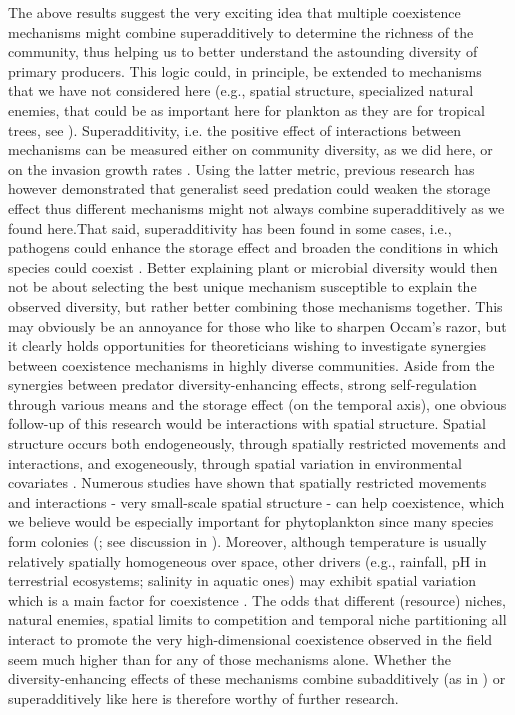 \documentclass[a4paper,12pt]{article}
\begin{document}
The above results suggest the very exciting idea that multiple coexistence
mechanisms might combine superadditively to determine the richness
of the community, thus helping us to better understand the astounding
diversity of primary producers. This logic could, in principle, be
extended to mechanisms that we have not considered here (e.g., spatial
structure, specialized natural enemies, that could be as important
here for plankton as they are for tropical trees, see \citealp{bagchi_pathogens_2014,comita_testing_2014,barraquand2018coastal}).
Superadditivity, i.e. the positive effect of interactions between
mechanisms can be measured either on community diversity, as we did
here, or on the invasion growth rates \citep{ellner_expanded_2019}.
Using the latter metric, previous research has however demonstrated
that generalist seed predation could weaken the storage effect \citep{kuang_coexistence_2009,kuang_interacting_2010}
thus different mechanisms might not always combine superadditively
as we found here.That said, superadditivity has been found in some
cases, i.e., pathogens could enhance the storage effect and broaden
the conditions in which species could coexist \citep{mordecai_pathogen_2015}.
Better explaining plant or microbial diversity would then not be about
selecting the best unique mechanism susceptible to explain the observed
diversity, but rather better combining those mechanisms together.
This may obviously be an annoyance for those who like to sharpen Occam's
razor, but it clearly holds opportunities for theoreticians wishing
to investigate synergies between coexistence mechanisms in highly
diverse communities. Aside from the synergies between predator diversity-enhancing
effects, strong self-regulation through various means and the storage
effect (on the temporal axis), one obvious follow-up of this research
would be interactions with spatial structure. Spatial structure occurs
both endogeneously, through spatially restricted movements and interactions,
and exogeneously, through spatial variation in environmental covariates
\citep{bolker_combining_2003}. Numerous studies \citep[e.g.,][]{bolker_spatial_1999,murrell_2002}
have shown that spatially restricted movements and interactions -
very small-scale spatial structure - can help coexistence, which we
believe would be especially important for phytoplankton since many
species form colonies (\citealp{reynolds2006ecology}; see discussion
in \citealp{barraquand2018coastal}). Moreover, although temperature
is usually relatively spatially homogeneous over space, other drivers
(e.g., rainfall, pH in terrestrial ecosystems; salinity in aquatic
ones) may exhibit spatial variation which is a main factor for coexistence
\citep{snyder_when_2008}. The odds that different (resource) niches,
natural enemies, spatial limits to competition and temporal niche
partitioning all interact to promote the very high-dimensional coexistence
observed in the field seem much higher than for any of those mechanisms
alone. Whether the diversity-enhancing effects of these mechanisms
combine subadditively (as in \citealp{kuang_interacting_2010}) or
superadditively like here is therefore worthy of further research.
\end{document}
